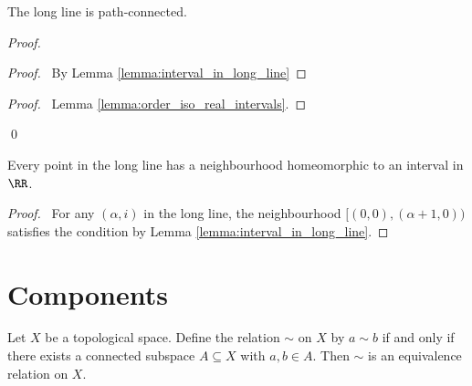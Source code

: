 \begin{proposition}[CC]
    The long line is path-connected.
\end{proposition}

\begin{proof}
    \pf
    \step{2}{\pflet{$(\alpha,i),(\beta,j) \in \omega_1 \times [0,1)$}}
    \step{3}{$[(0,0),(\beta + 1, 0)) \cong [0,1)$}
    \begin{proof}
        \pf\ By Lemma \ref{lemma:interval_in_long_line}
    \end{proof}
    \step{4}{$[(\alpha,i),(\beta,j)) \cong [0,1)$}
    \begin{proof}
        \pf\ Lemma \ref{lemma:order_iso_real_intervals}.
    \end{proof}
    \step{5}{\pick\ a homeomorphism $q : [0,1) \rightarrow [(\alpha,i),(\beta,j))$}
    \qed
\end{proof}

\begin{proposition}
    Every point in the long line has a neighbourhood homeomorphic to an interval in $\RR$.
\end{proposition}

\begin{proof}
    \pf\ For any $(\alpha, i)$ in the long line, the neighbourhood $[(0,0),(\alpha + 1, 0))$
    satisfies the condition by Lemma \ref{lemma:interval_in_long_line}.
\end{proof}

\section{Components}

\begin{proposition}
    Let $X$ be a topological space. Define the relation $\sim$ on $X$ by
    $a \sim b$ if and only if there exists a connected subspace $A \subseteq X$
    with $a, b \in A$. Then $\sim$ is an equivalence relation on $X$.
\end{proposition}

